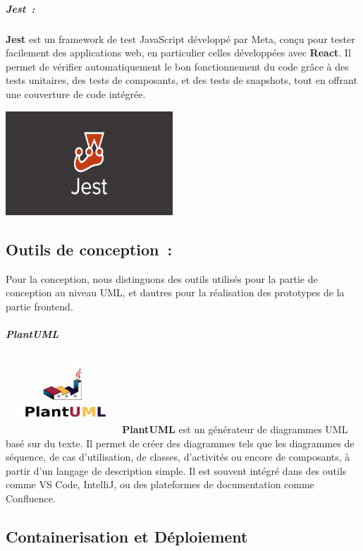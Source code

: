 \documentclass[12pt,a4paper,twoside]{report}
\begin{document}
\hypertarget{jest}{%
\subparagraph{Jest~:}\label{jest}}

\textbf{Jest} est un framework de test JavaScript développé par Meta,
conçu pour tester facilement des applications web, en particulier celles
développées avec \textbf{React}. Il permet de vérifier automatiquement
le bon fonctionnement du code grâce à des tests unitaires, des tests de
composants, et des tests de snapshots, tout en offrant une couverture de
code intégrée.

\includegraphics[width=2.47569in,height=1.53542in]{latex_media/media/image36.png}

\hypertarget{outils-de-conception}{%
\subsection{Outils de conception~:}\label{outils-de-conception}}

Pour la conception, nous distinguons des outils utilisés pour la partie
de conception au niveau UML, et d\textquotesingle autres pour la
réalisation des prototypes de la partie frontend.

\hypertarget{plantuml}{%
\subparagraph{PlantUML~}\label{plantuml}}

\includegraphics[width=1.72222in,height=1.11389in]{latex_media/media/image37.png}\textbf{PlantUML}
est un générateur de diagrammes UML basé sur du texte. Il permet de
créer des diagrammes tels que les diagrammes de séquence, de cas
d'utilisation, de classes, d'activités ou encore de composants, à partir
d'un langage de description simple. Il est souvent intégré dans des
outils comme VS Code, IntelliJ, ou des plateformes de documentation
comme Confluence.

\hypertarget{containerisation-et-duxe9ploiement}{%
\subsection{Containerisation et
Déploiement}\label{containerisation-et-duxe9ploiement}}
\end{document}
